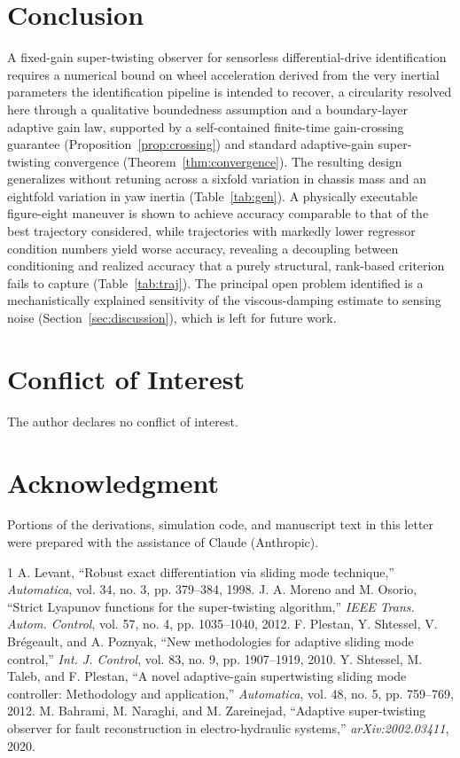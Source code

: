 \documentclass[letterpaper, 10 pt, conference]{ieeeconf}
\begin{document}
\section{Conclusion}
\label{sec:conclusion}
A fixed-gain super-twisting observer for sensorless differential-drive identification requires a numerical bound on wheel acceleration derived from the very inertial parameters the identification pipeline is intended to recover, a circularity resolved here through a qualitative boundedness assumption and a boundary-layer adaptive gain law, supported by a self-contained finite-time gain-crossing guarantee (Proposition~\ref{prop:crossing}) and standard adaptive-gain super-twisting convergence (Theorem~\ref{thm:convergence}). The resulting design generalizes without retuning across a sixfold variation in chassis mass and an eightfold variation in yaw inertia (Table~\ref{tab:gen}). A physically executable figure-eight maneuver is shown to achieve accuracy comparable to that of the best trajectory considered, while trajectories with markedly lower regressor condition numbers yield worse accuracy, revealing a decoupling between conditioning and realized accuracy that a purely structural, rank-based criterion fails to capture (Table~\ref{tab:traj}). The principal open problem identified is a mechanistically explained sensitivity of the viscous-damping estimate to sensing noise (Section~\ref{sec:discussion}), which is left for future work.

\section*{Conflict of Interest}
The author declares no conflict of interest.

\section*{Acknowledgment}
Portions of the derivations, simulation code, and manuscript text in this letter were prepared with the assistance of Claude (Anthropic).

\begin{thebibliography}{1}
 A. Levant, ``Robust exact differentiation via sliding mode technique,'' \emph{Automatica}, vol. 34, no. 3, pp. 379--384, 1998.
 J. A. Moreno and M. Osorio, ``Strict Lyapunov functions for the super-twisting algorithm,'' \emph{IEEE Trans. Autom. Control}, vol. 57, no. 4, pp. 1035--1040, 2012.
 F. Plestan, Y. Shtessel, V. Br\'{e}geault, and A. Poznyak, ``New methodologies for adaptive sliding mode control,'' \emph{Int. J. Control}, vol. 83, no. 9, pp. 1907--1919, 2010.
 Y. Shtessel, M. Taleb, and F. Plestan, ``A novel adaptive-gain supertwisting sliding mode controller: Methodology and application,'' \emph{Automatica}, vol. 48, no. 5, pp. 759--769, 2012.
 M. Bahrami, M. Naraghi, and M. Zareinejad, ``Adaptive super-twisting observer for fault reconstruction in electro-hydraulic systems,'' \emph{arXiv:2002.03411}, 2020.
\end{thebibliography}
\end{document}
